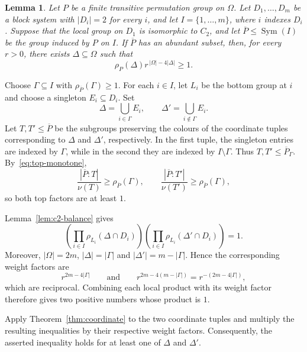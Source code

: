 \documentclass[10pt]{amsart}
\newtheorem{lemma}[theorem]{Lemma}
\theoremstyle{definition}
\renewcommand{\ge}{\geqslant}
\renewcommand{\leq}{\leqslant}
\renewcommand{\geq}{\geqslant}
\let\oldendproof\endproof
\renewenvironment{proof}[1][\proofname]{%
  \oldproof[\bfseries #1]%
}{\oldendproof}
\DeclareMathOperator{\Sym}{Sym}
\numberwithin{equation}{section}
\numberwithin{table}{section}
\begin{document}
\begin{lemma}\label{lem:c2-weighted}
Let $P$ be a finite transitive permutation group on $\Omega$. Let
$D_1,\ldots,D_m$ be a block system with $|D_i|=2$ for every $i$, and let
$I=\{1,\ldots,m\}$, where $i$ indexes $D_i$. Suppose that the local group on $D_1$ is isomorphic to
$C_2$, and let
$\overline P\leq\Sym(I)$ be the group induced by $P$ on $I$. If $\overline P$ has
an abundant subset, then, for every $r>0$, there exists
$\Delta\subseteq\Omega$ such that
$$
  \rho_P(\Delta)r^{\,|\Omega|-4|\Delta|}\ge1.
$$
\end{lemma}

\begin{proof}
Choose $\Gamma\subseteq I$ with
$\rho_{\overline P}(\Gamma)\geq1$. For each $i\in I$, let $L_i$ be the
bottom group at $i$ and choose a singleton $E_i\subseteq D_i$. Set
$$
  \Delta=\bigcup_{i\in\Gamma}E_i,
  \qquad
  \Delta'=\bigcup_{i\notin\Gamma}E_i.
$$
Let $T,T'\leq\overline P$ be the subgroups preserving the colours of the
coordinate tuples corresponding to $\Delta$ and $\Delta'$, respectively.
In the first tuple, the singleton entries are indexed by
$\Gamma$, while in the second they are indexed by $I\setminus\Gamma$.
Thus $T,T'\leq\overline P_\Gamma$. By~\eqref{eq:top-monotone},
$$
  \frac{|\overline P:T|}{\nu(T)}
  \geq\rho_{\overline P}(\Gamma),
  \qquad
  \frac{|\overline P:T'|}{\nu(T')}
  \geq\rho_{\overline P}(\Gamma),
$$
so both top factors are at least $1$.

Lemma~\ref{lem:c2-balance} gives
$$
 \left(\prod_{i\in I}\rho_{L_i}(\Delta\cap D_i)\right)
 \left(\prod_{i\in I}\rho_{L_i}(\Delta'\cap D_i)\right)=1.
$$
Moreover, $|\Omega|=2m$, $|\Delta|=|\Gamma|$ and
$|\Delta'|=m-|\Gamma|$. Hence the corresponding weight factors are
$$
 r^{2m-4|\Gamma|}
 \qquad\text{and}\qquad
 r^{2m-4(m-|\Gamma|)}=r^{-(2m-4|\Gamma|)},
$$
which are reciprocal. Combining each local product with its weight
factor therefore gives two positive numbers whose product is $1$.

Apply Theorem~\ref{thm:coordinate} to the two coordinate tuples and
multiply the resulting inequalities by their respective weight factors.
Consequently, the asserted inequality holds for at least one of $\Delta$
and $\Delta'$.
\end{proof}
\end{document}
